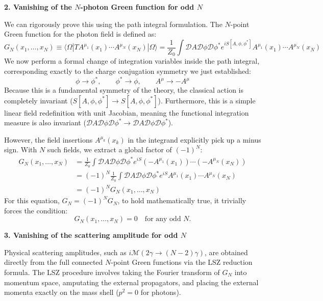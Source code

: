 \textbf{2. Vanishing of the $N$-photon Green function for odd $N$}

We can rigorously prove this using the path integral formulation. The $N$-point Green function for the photon field is defined as:
\[
    G_N(x_1, \dots, x_N) \equiv \langle \Omega | T A^{\mu_1}(x_1) \cdots A^{\mu_N}(x_N) | \Omega \rangle = \frac{1}{Z_0} \int \mathcal{D}A \mathcal{D}\phi \mathcal{D}\phi^* e^{iS[A, \phi, \phi^*]} A^{\mu_1}(x_1) \cdots A^{\mu_N}(x_N)
\]
We now perform a formal change of integration variables inside the path integral, corresponding exactly to the charge conjugation symmetry we just established:
\[
    \phi \to \phi^*, \qquad \phi^* \to \phi, \qquad A^\mu \to -A^\mu
\]
Because this is a fundamental symmetry of the theory, the classical action is completely invariant ($S[A, \phi, \phi^*] \to S[A, \phi, \phi^*]$). Furthermore, this is a simple linear field redefinition with unit Jacobian, meaning the functional integration measure is also invariant ($\mathcal{D}A \mathcal{D}\phi \mathcal{D}\phi^* \to \mathcal{D}A \mathcal{D}\phi \mathcal{D}\phi^*$).

However, the field insertions $A^{\mu_k}(x_k)$ in the integrand explicitly pick up a minus sign. With $N$ such fields, we extract a global factor of $(-1)^N$:
\[
    \begin{aligned}
        G_N(x_1, \dots, x_N) & = \frac{1}{Z_0} \int \mathcal{D}A \mathcal{D}\phi \mathcal{D}\phi^* e^{iS} (-A^{\mu_1}(x_1)) \cdots (-A^{\mu_N}(x_N))  \\
                             & = (-1)^N \frac{1}{Z_0} \int \mathcal{D}A \mathcal{D}\phi \mathcal{D}\phi^* e^{iS} A^{\mu_1}(x_1) \cdots A^{\mu_N}(x_N) \\
                             & = (-1)^N G_N(x_1, \dots, x_N)
    \end{aligned}
\]
For this equation, $G_N = (-1)^N G_N$, to hold mathematically true, it trivially forces the condition:
\[
    G_N(x_1, \dots, x_N) = 0 \quad \text{for any odd } N.
\]

\textbf{3. Vanishing of the scattering amplitude for odd $N$}

Physical scattering amplitudes, such as $i\mathcal{M}(2\gamma \to (N-2)\gamma)$, are obtained directly from the full connected $N$-point Green functions via the LSZ reduction formula. The LSZ procedure involves taking the Fourier transform of $G_N$ into momentum space, amputating the external propagators, and placing the external momenta exactly on the mass shell ($p^2 = 0$ for photons).

